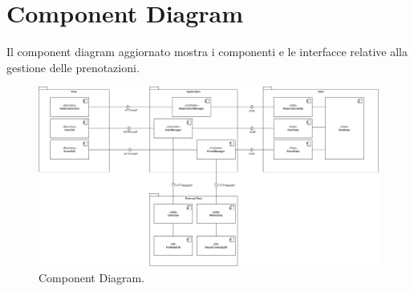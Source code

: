 \section{Component Diagram} 
Il component diagram aggiornato mostra i componenti e le interfacce relative alla gestione delle prenotazioni.
\begin{figure}[h!]
	\centering
	\includegraphics[width=0.8\linewidth]{diagrams/Component.drawio.png}
	\caption{Component Diagram.}
	\label{fig:ComponentDiagram}
\end{figure}